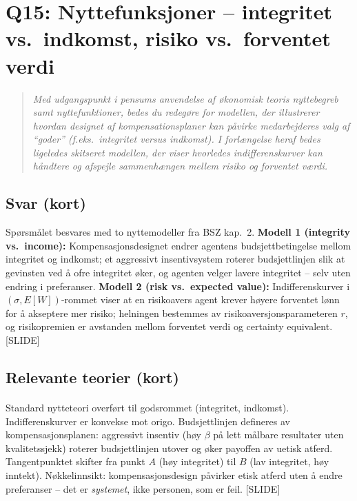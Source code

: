 \section{Q15: Nyttefunksjoner -- integritet vs.\ indkomst, risiko vs.\ forventet verdi}\label{q:15}

\begin{quote}
\emph{Med udgangspunkt i pensums anvendelse af økonomisk teoris nyttebegreb samt nyttefunktioner, bedes du redegøre for modellen, der illustrerer hvordan designet af kompensationsplaner kan påvirke medarbejderes valg af ``goder'' (f.eks.\ integritet versus indkomst). I forlængelse heraf bedes ligeledes skitseret modellen, der viser hvorledes indifferenskurver kan håndtere og afspejle sammenhængen mellem risiko og forventet værdi.}
\end{quote}

\subsection*{Svar (kort)}
Spørsmålet besvares med to nyttemodeller fra BSZ kap.\ 2. \textbf{Modell 1 (integrity vs.\ income):} Kompensasjonsdesignet endrer agentens budsjettbetingelse mellom integritet og indkomst; et aggressivt insentivsystem roterer budsjettlinjen slik at gevinsten ved å ofre integritet øker, og agenten velger lavere integritet -- selv uten endring i preferanser. \textbf{Modell 2 (risk vs.\ expected value):} Indifferenskurver i $(\sigma, E[W])$-rommet viser at en risikoavers agent krever høyere forventet lønn for å akseptere mer risiko; helningen bestemmes av risikoaversjons\-parameteren $r$, og risikopremien er avstanden mellom forventet verdi og certainty equivalent. [SLIDE]

\subsection*{Relevante teorier (kort)}

\paragraph{\quad\SThree}
Standard nytteteori overført til godsrommet (integritet, indkomst). Indifferenskurver er konvekse mot origo. Budsjettlinjen defineres av kompensasjonsplanen: aggressivt insentiv (høy $\beta$ på lett målbare resultater uten kvalitetssjekk) roterer budsjettlinjen utover og øker payoffen av uetisk atferd. Tangentpunktet skifter fra punkt $A$ (høy integritet) til $B$ (lav integritet, høy inntekt). Nøkkelinnsikt: kompensasjonsdesign påvirker etisk atferd uten å endre preferanser -- det er \emph{systemet}, ikke personen, som er feil. [SLIDE]

